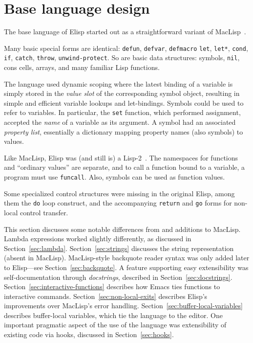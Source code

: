 \documentclass[format=acmsmall, review=false, screen=true]{acmart}
\newcommand \Elisp {Elisp}
\begin{document}
\section{Base language design}
\label{sec:base-language-design}

The base language of \Elisp{} started out as a straightforward
variant of MacLisp~\cite{Moon1974,Pitman1983}.

Many basic special forms are identical: \texttt{defun},
\texttt{defvar}, \texttt{defmacro} \texttt{let}, \texttt{let*},
\texttt{cond}, \texttt{if}, \texttt{catch}, \texttt{throw},
\texttt{unwind-protect}.  So are basic data structures: symbols,
\texttt{nil}, cons cells, arrays, and many familiar Lisp
functions.

The language used dynamic scoping where the latest binding of a variable is
simply stored in the \emph{value slot} of the corresponding symbol object,
resulting in simple and efficient variable lookups and let-bindings.
Symbols could be used to refer to variables.  In particular, the
\texttt{set} function, which performed assignment, accepted the
\emph{name} of a variable as its argument.  A symbol had an associated
\emph{property list}, essentially a dictionary mapping property
names (also symbols) to values.

Like MacLisp, \Elisp{} was (and still is) a
Lisp-2~\cite{SteeleGabriel1993}.  The namespaces for functions and
``ordinary values'' are separate, and to call a function bound to a
variable, a program must use \texttt{funcall}.  Also, symbols can be
used as function values.

Some specialized control structures were missing in the original
\Elisp{}, among them the \texttt{do} loop construct, and the
accompanying \texttt{return} and \texttt{go} forms for non-local
control transfer.

This section discusses some notable differences from and additions to
MacLisp.  Lambda expressions worked slightly differently, as discussed
in Section~\ref{sec:lambda}.  Section~\ref{sec:strings} discusses the
string representation (absent in MacLisp).
MacLisp-style backquote reader syntax was only added later to \Elisp{}---see Section~\ref{sec:backquote}.
A feature supporting easy extensibility was self-documentation
through \emph{docstrings}, described in
Section~\ref{sec:docstrings}.
Section~\ref{sec:interactive-functions} describes how Emacs ties
functions to interactive commands.
Section~\ref{sec:non-local-exits} describes \Elisp{}'s improvements
over MacLisp's error handling.
Section~\ref{sec:buffer-local-variables} describes buffer-local
variables, which tie the language to the editor.  One important
pragmatic aspect of the use of the language was extensibility of
existing code via hooks, discussed in Section~\ref{sec:hooks}.
\end{document}
